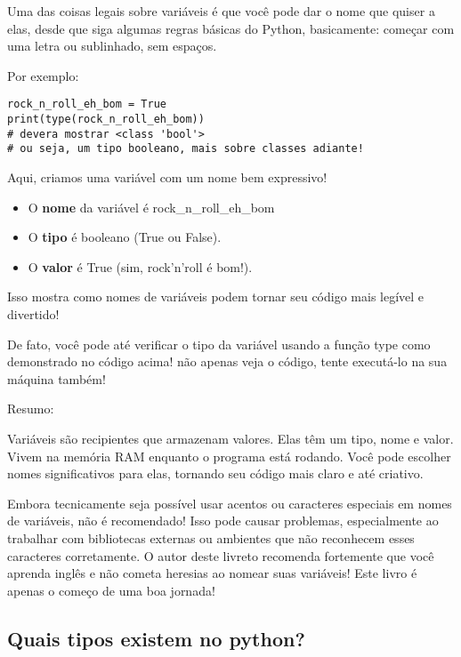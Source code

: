 \documentclass[12pt]{book}
\begin{document}
	Uma das coisas legais sobre variáveis é que você pode dar o nome que quiser a elas, desde que siga algumas regras básicas do Python, basicamente: começar com uma letra ou sublinhado, sem espaços.
	
	Por exemplo:
	
	\begin{lstlisting}[caption={exemplo de variável}] 
rock_n_roll_eh_bom = True
print(type(rock_n_roll_eh_bom))
# devera mostrar <class 'bool'>
# ou seja, um tipo booleano, mais sobre classes adiante!
\end{lstlisting}
	
	
	Aqui, criamos uma variável com um nome bem expressivo!
	
	\begin{itemize}
		\item O \textbf{nome} da variável é rock\_n\_roll\_eh\_bom
		\item O \textbf{tipo} é booleano (True ou False).
		\item O \textbf{valor} é True (sim, rock'n'roll é bom!).
	\end{itemize}
	
	Isso mostra como nomes de variáveis podem tornar seu código mais legível e divertido!
	
	De fato, você pode até verificar o tipo da variável usando a função type\(\) como demonstrado no código acima! não apenas veja o código, tente executá-lo na sua máquina também!
	
	Resumo:
	
	Variáveis são recipientes que armazenam valores.
	Elas têm um tipo, nome e valor. Vivem na memória RAM enquanto o programa está rodando.
	Você pode escolher nomes significativos para elas, tornando seu código mais claro e até criativo.
	
	\begin{tcolorbox}[colback=gray!10, colframe=black, title={\large\bfseries Observação}]
		Embora tecnicamente seja possível usar acentos ou caracteres especiais em nomes de variáveis, não é recomendado! Isso pode causar problemas, especialmente ao trabalhar com bibliotecas externas ou ambientes que não reconhecem esses caracteres corretamente. O autor deste livreto recomenda fortemente que você aprenda inglês e não cometa heresias ao nomear suas variáveis! Este livro é apenas o começo de uma boa jornada!
	\end{tcolorbox}
	
	\subsection{Quais tipos existem no python?}
	
\end{document}
